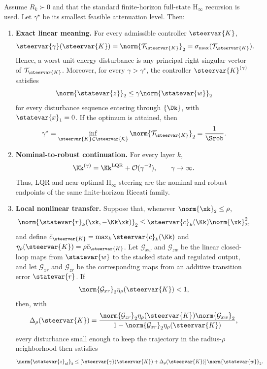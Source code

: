 \begin{theorem}
\label{thm:unified-robust-steering}
Assume $R_k\succ0$ and that the standard finite-horizon full-state
$\mathrm{H}_{\infty}$ recursion is used.  Let $\gamma^\star$ be its smallest
feasible attenuation level.  Then:

\begin{enumerate}
    \item[(i)] \textbf{Exact linear meaning.}
    For every admissible controller $\steervar{K}$,
    $$
    \steervar{\gamma}(\steervar{K})
    =
    \norm{\mathcal{T}_{\steervar{K}}}_2
    =
    \sigma_{\max}(\mathcal{T}_{\steervar{K}}).
    $$
    Hence, a worst unit-energy disturbance is any principal right singular
    vector of $\mathcal{T}_{\steervar{K}}$.  Moreover, for every
    $\gamma>\gamma^\star$, the controller
    $\steervar{K}^{(\gamma)}$ satisfies
    $$
    \norm{\statevar{z}}_2
    \leq
    \gamma\norm{\statevar{w}}_2
    $$
    for every disturbance sequence entering through $\{\Dk\}$, with
    $\statevar{x}_1=0$.  If the optimum is attained, then
    $$
    \gamma^\star
    =
    \inf_{\steervar{K}\in\steervar{\mathcal K}}
    \norm{\mathcal{T}_{\steervar{K}}}_2
    =
    \frac{1}{\Srob}.
    $$

    \item[(ii)] \textbf{Nominal-to-robust continuation.}
    For every layer $k$,
    $$
    \Kk^{(\gamma)}
    =
    \Kk^{\mathrm{LQR}}
    +
    \mathcal{O}(\gamma^{-2}),
    \qquad
    \gamma\rightarrow\infty.
    $$
    Thus, LQR and near-optimal $\mathrm{H}_{\infty}$ steering are the nominal
    and robust endpoints of the same finite-horizon Riccati family.

    \item[(iii)] \textbf{Local nonlinear transfer.}
    Suppose that, whenever $\norm{\xk}_2\leq\rho$,
    $$
    \norm{\statevar{r}_k(\xk,-\Kk\xk)}_2
    \leq
    \steervar{c}_k(\Kk)\norm{\xk}_2^2,
    $$
    and define
    $\bar c_{\steervar{K}}=\max_k\steervar{c}_k(\Kk)$ and
    $\eta_\rho(\steervar{K})=\rho\bar c_{\steervar{K}}$.
    Let $\mathcal{G}_{xw}$ and $\mathcal{G}_{zw}$ be the linear closed-loop
    maps from $\statevar{w}$ to the stacked state and regulated output, and let
    $\mathcal{G}_{xr}$ and $\mathcal{G}_{zr}$ be the corresponding maps from an
    additive transition error $\statevar{r}$.  If
    $$
    \norm{\mathcal{G}_{xr}}_2
    \eta_\rho(\steervar{K})
    <1,
    $$
    then, with
    $$
    \Delta_\rho(\steervar{K})
    =
    \frac{
        \norm{\mathcal{G}_{zr}}_2
        \eta_\rho(\steervar{K})
        \norm{\mathcal{G}_{xw}}_2
    }{
        1-
        \norm{\mathcal{G}_{xr}}_2
        \eta_\rho(\steervar{K})
    },
    $$
    every disturbance small enough to keep the trajectory in the
    radius-$\rho$ neighborhood then satisfies
    $$
    \norm{\statevar{z}_{\mathrm{nl}}}_2
    \leq
    \left[
    \steervar{\gamma}(\steervar{K})
    +\Delta_\rho(\steervar{K})
    \right]
    \norm{\statevar{w}}_2.
    $$
\end{enumerate}
\end{theorem}

